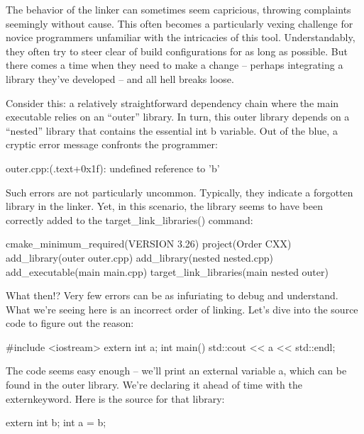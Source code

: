 
The behavior of the linker can sometimes seem capricious, throwing complaints seemingly without cause. This often becomes a particularly vexing challenge for novice programmers unfamiliar with the intricacies of this tool. Understandably, they often try to steer clear of build configurations for as long as possible. But there comes a time when they need to make a change – perhaps integrating a library they’ve developed – and all hell breaks loose.

Consider this: a relatively straightforward dependency chain where the main executable relies on an “outer” library. In turn, this outer library depends on a “nested” library that contains the essential int b variable. Out of the blue, a cryptic error message confronts the programmer:

\begin{shell}
outer.cpp:(.text+0x1f): undefined reference to 'b'
\end{shell}

Such errors are not particularly uncommon. Typically, they indicate a forgotten library in the linker. Yet, in this scenario, the library seems to have been correctly added to the target\_link\_libraries() command:


\begin{cmake}
cmake_minimum_required(VERSION 3.26)
project(Order CXX)
add_library(outer outer.cpp)
add_library(nested nested.cpp)
add_executable(main main.cpp)
target_link_libraries(main nested outer)
\end{cmake}

What then!? Very few errors can be as infuriating to debug and understand. What we’re seeing here is an incorrect order of linking. Let’s dive into the source code to figure out the reason:


\begin{cmake}
#include <iostream>
extern int a;
int main() {
    std::cout << a << std::endl;
}
\end{cmake}

The code seems easy enough – we’ll print an external variable a, which can be found in the outer library. We’re declaring it ahead of time with the externkeyword. Here is the source for that library:


\begin{cmake}
extern int b;
int a = b;
\end{cmake}


